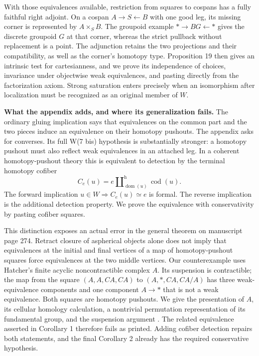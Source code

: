 With those equivalences available, restriction from squares to cospans has a fully faithful right adjoint. On a cospan $A\to S\leftarrow B$ with one good leg, its missing corner is represented by $A\times_S B$. The groupoid example $*\to BG\leftarrow *$ gives the discrete groupoid $G$ at that corner, whereas the strict pullback without replacement is a point. The adjunction retains the two projections and their compatibility, as well as the corner's homotopy type. Proposition 19 then gives an intrinsic test for cartesianness, and we prove its independence of choices, invariance under objectwise weak equivalences, and pasting directly from the factorization axiom. Strong saturation enters precisely when an isomorphism after localization must be recognized as an original member of $W$.

\medskip\noindent\textbf{What the appendix adds, and where its generalization fails.}
The ordinary gluing implication says that equivalences on the common part and the two pieces induce an equivalence on their homotopy pushouts. The appendix asks for converses. Its full W(7 bis) hypothesis is substantially stronger: a homotopy pushout must also reflect weak equivalences in an attached leg. In a coherent homotopy-pushout theory this is equivalent to detection by the terminal homotopy cofiber
\[
 C_e(u)=e\amalg^{\mathrm h}_{\operatorname{dom}(u)}
                         \operatorname{cod}(u).
\]
The forward implication $u\in W\Rightarrow C_e(u)\simeq e$ is formal. The reverse implication is the additional detection property. We prove the equivalence with conservativity by pasting cofiber squares.

This distinction exposes an actual error in the general theorem on manuscript page 274. Retract closure of aspherical objects alone does not imply that equivalences at the initial and final vertices of a map of homotopy-pushout squares force equivalences at the two middle vertices. Our counterexample uses Hatcher's finite acyclic noncontractible complex $A$. Its suspension is contractible; the map from the square $(A,A,CA,CA)$ to $(A,*,CA,CA/A)$ has three weak-equivalence components and one component $A\to *$ that is not a weak equivalence. Both squares are homotopy pushouts. We give the presentation of $A$, its cellular homology calculation, a nontrivial permutation representation of its fundamental group, and the suspension argument \citep[Example~2.38]{Hatcher2002}. The related equivalence asserted in Corollary 1 therefore fails as printed. Adding cofiber detection repairs both statements, and the final Corollary 2 already has the required conservative hypothesis.

